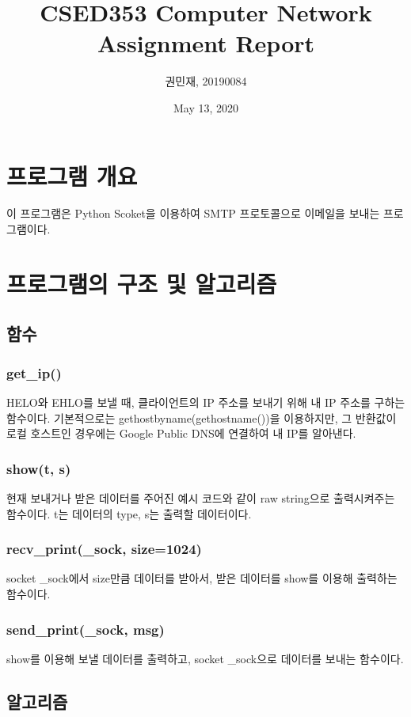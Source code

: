 \documentclass{article}
\begin{document}
    \author{권민재, 20190084}
    \title{CSED353 Computer Network Assignment Report}
    \date{May 13, 2020}
    \maketitle


    \section{프로그램 개요}
     이 프로그램은 Python Scoket을 이용하여 SMTP 프로토콜으로 이메일을 보내는 프로그램이다.

    \section{프로그램의 구조 및 알고리즘}
    \subsection{함수}
    \subsubsection{get\_ip()}
    HELO와 EHLO를 보낼 때, 클라이언트의 IP 주소를 보내기 위해 내 IP 주소를 구하는 함수이다.
    기본적으로는 gethostbyname(gethostname())을 이용하지만, 그 반환값이 로컬 호스트인 경우에는 Google Public DNS에 연결하여 내 IP를 알아낸다.
    \subsubsection{show(t, s)}
    현재 보내거나 받은 데이터를 주어진 예시 코드와 같이 raw string으로 출력시켜주는 함수이다.
    t는 데이터의 type, s는 출력할 데이터이다.
    \subsubsection{recv\_print(\_sock, size=1024)}
    socket \_sock에서 size만큼 데이터를 받아서, 받은 데이터를 show를 이용해 출력하는 함수이다.
    \subsubsection{send\_print(\_sock, msg)}
    show를 이용해 보낼 데이터를 출력하고, socket \_sock으로 데이터를 보내는 함수이다.

    \subsection{알고리즘}
\end{document}
